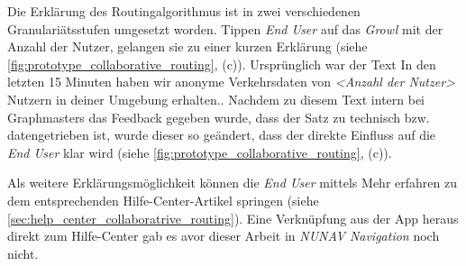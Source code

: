 Die Erklärung des Routingalgorithmus ist in zwei verschiedenen Granulariätsstufen umgesetzt worden. Tippen \textit{End User} auf das \textit{Growl} mit der Anzahl der Nutzer, gelangen sie zu einer kurzen Erklärung (siehe \autoref{fig:prototype_collaborative_routing}, (c)). Ursprünglich war der Text \glqq In den letzten 15 Minuten haben wir anonyme Verkehrsdaten von \textit{<Anzahl der Nutzer>} Nutzern in deiner Umgebung erhalten.\grqq{}. Nachdem zu diesem Text intern bei Graphmasters das Feedback gegeben wurde, dass der Satz zu technisch bzw. datengetrieben ist, wurde dieser so geändert, dass der direkte Einfluss auf die \textit{End User} klar wird (siehe \autoref{fig:prototype_collaborative_routing}, (c)).

Als weitere Erklärungsmöglichkeit können die \textit{End User} mittels \glqq Mehr erfahren\grqq{} zu dem entsprechenden Hilfe-Center-Artikel springen (siehe \autoref{sec:help_center_collaboratrive_routing}). Eine Verknüpfung aus der App heraus direkt zum Hilfe-Center gab es avor dieser Arbeit in \textit{NUNAV Navigation} noch nicht.

